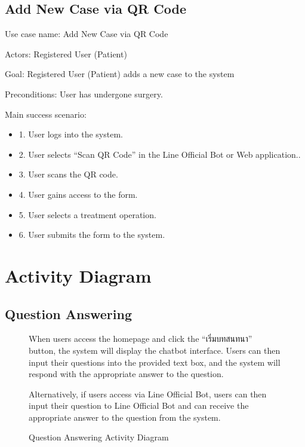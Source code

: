 \documentclass[12pt,oneside,openright,a4paper]{cpe-english-project}
\begin{document}
      \subsection{Add New Case via QR Code}
        \qquad Use case name: Add New Case via QR Code \par
        \qquad Actors: Registered User (Patient) \par
        \qquad Goal: Registered User (Patient) adds a new case to the system\par
        \qquad Preconditions: User has undergone surgery. \par
        \qquad Main success scenario:
        \begin{itemize}
          \item[] 1. User logs into the system.
          \item[] 2. User selects “Scan QR Code” in the Line Official Bot or Web application..
          \item[] 3. User scans the QR code.
          \item[] 4. User gains access to the form.
          \item[] 5. User selects a treatment operation.
          \item[] 6. User submits the form to the system.
        \end{itemize}

\newpage
    \section{Activity Diagram}
      \subsection{Question Answering}
      \begin{figure}[!h]
        \centering
        \caption{Question Answering Activity Diagram}\label{fig:AD_FAQ}
        \begin{justify}
          \qquad When users access the homepage and click the “\textthai{เริ่มบทสนทนา}” button, the system will display the chatbot interface. Users can then input their questions into the provided text box, and the system will respond with the appropriate answer to the question. \par
          \qquad Alternatively, if users access via Line Official Bot, users can then input their question to Line Official Bot and can receive the appropriate answer to the question from the system. \par
        \end{justify}
      \end{figure}
\end{document}

